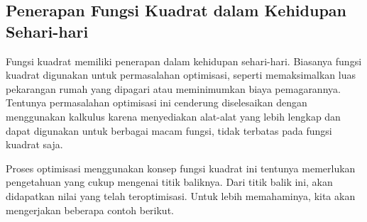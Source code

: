 \subsection{Penerapan Fungsi Kuadrat dalam Kehidupan Sehari-hari}
	
	Fungsi kuadrat memiliki penerapan dalam kehidupan sehari-hari. Biasanya fungsi kuadrat digunakan untuk permasalahan optimisasi, seperti memaksimalkan luas pekarangan rumah yang dipagari atau meminimumkan biaya pemagarannya. Tentunya permasalahan optimisasi ini cenderung diselesaikan dengan menggunakan kalkulus karena menyediakan alat-alat yang lebih lengkap dan dapat digunakan untuk berbagai macam fungsi, tidak terbatas pada fungsi kuadrat saja.
	
	\par Proses optimisasi menggunakan konsep fungsi kuadrat ini tentunya memerlukan pengetahuan yang cukup mengenai titik baliknya. Dari titik balik ini, akan didapatkan nilai yang telah teroptimisasi. Untuk lebih memahaminya, kita akan mengerjakan beberapa contoh berikut.
	
